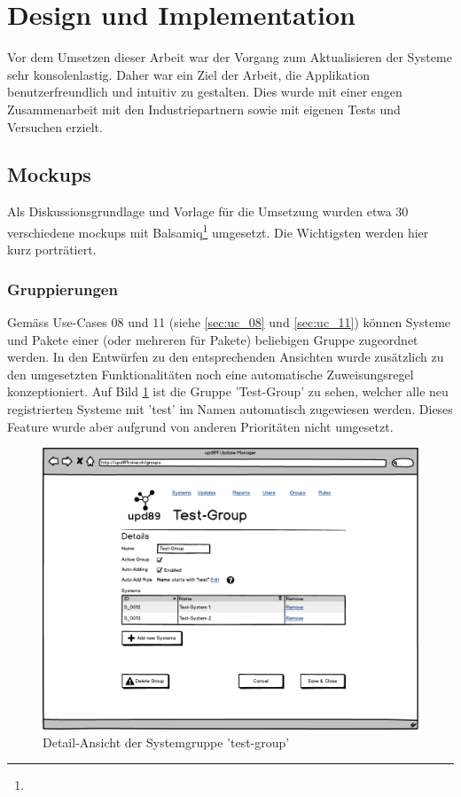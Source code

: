 \section{Design und Implementation}

Vor dem Umsetzen dieser Arbeit war der Vorgang zum Aktualisieren der Systeme sehr konsolenlastig. Daher war ein Ziel der Arbeit, die Applikation benutzerfreundlich und intuitiv zu gestalten. Dies wurde mit einer engen Zusammenarbeit mit den Industriepartnern sowie mit eigenen Tests und Versuchen erzielt.

\subsection*{Mockups} \label{design:mockups}

Als Diskussionsgrundlage und Vorlage für die Umsetzung wurden etwa 30 verschiedene \glspl{mockup} mit Balsamiq\footnote{} umgesetzt. Die Wichtigsten werden hier kurz porträtiert.

\subsubsection*{Gruppierungen}

Gemäss Use-Cases 08 und 11 (siehe \ref{sec:uc_08} und \ref{sec:uc_11}) können Systeme und Pakete einer (oder mehreren für Pakete) beliebigen Gruppe zugeordnet werden. In den Entwürfen zu den entsprechenden Ansichten wurde zusätzlich zu den umgesetzten Funktionalitäten noch eine automatische Zuweisungsregel konzeptioniert. Auf Bild \ref{fig:design:group_systems_mockup} ist die Gruppe 'Test-Group' zu sehen, welcher alle neu registrierten Systeme mit 'test' im Namen automatisch zugewiesen werden. Dieses Feature wurde aber aufgrund von anderen Prioritäten nicht umgesetzt.

\begin{figure}[H]
	\centering
	\includegraphics[width=\linewidth]{files/mockups/group_systems}
	\caption{Detail-Ansicht der Systemgruppe 'test-group'}
	\label{fig:design:group_systems_mockup}
\end{figure}

